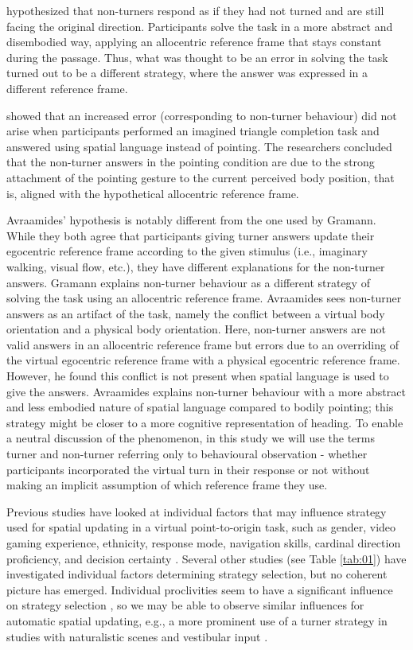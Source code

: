 \documentclass{frontiersSCNS} %
\begin{document}
\citep{Gramann2011} hypothesized that non-turners respond as if they had not turned and are still facing the original direction. Participants solve the task in a more abstract and disembodied way, applying an allocentric reference frame that stays constant during the passage. Thus, what was thought to be an error in solving the task turned out to be a different strategy, where the answer was expressed in a different reference frame.

\citep{Avraamides2004} showed that an increased error (corresponding to non-turner behaviour) did not arise when participants performed an imagined triangle completion task and answered using spatial language instead of pointing. The researchers concluded that the non-turner answers in the pointing condition are due to the strong attachment of the pointing gesture to the current perceived body position, that is, aligned with the hypothetical allocentric reference frame. 

Avraamides' hypothesis is notably different from the one used by Gramann. While they both agree that participants giving turner answers update their egocentric reference frame according to the given stimulus (i.e., imaginary walking, visual flow, etc.), they have different explanations for the non-turner answers. Gramann explains non-turner behaviour as a different strategy of solving the task using an allocentric reference frame. Avraamides sees non-turner answers as an artifact of the task, namely the conflict between a virtual body orientation and a physical body orientation. Here, non-turner answers are not valid answers in an allocentric reference frame but errors due to an overriding of the virtual egocentric reference frame with a physical egocentric reference frame. However, he found this conflict is not present when spatial language is used to give the answers. Avraamides explains non-turner behaviour with a more abstract and less embodied nature of spatial language compared to bodily pointing; this strategy might be closer to a more cognitive representation of heading. To enable a neutral discussion of the phenomenon, in this study we will use the terms turner and non-turner referring only to behavioural observation - whether participants incorporated the virtual turn in their response or not without making an implicit assumption of which reference frame they use.

Previous studies have looked at individual factors that may influence strategy used for spatial updating in a virtual point-to-origin task, such as gender, video gaming experience, ethnicity, response mode, navigation skills, cardinal direction proficiency, and decision certainty \citep{Goeke2013,Avraamides2004,Riecke2008}. Several other studies (see Table \ref{tab:01}) have investigated individual factors determining strategy selection, but no coherent picture has emerged. Individual proclivities seem to have a significant influence on strategy selection \citep{Gramann2011}, so we may be able to observe similar influences for automatic spatial updating, e.g., a more prominent use of a turner strategy in studies with naturalistic scenes and vestibular input \citep{Sigurdarson}. 
\end{document}
